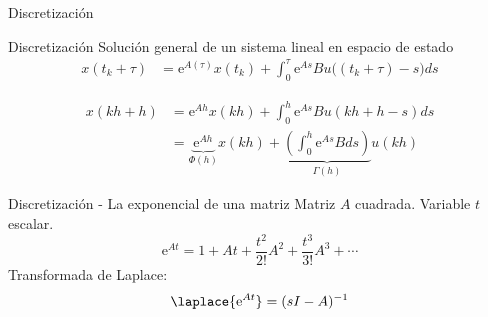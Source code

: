 \documentclass[presentation,aspectratio=1610]{beamer}
\begin{document}
\begin{frame}[label={sec:org9977e67}]{Discretización}
\end{frame}
\begin{frame}[label={sec:orgc00def8}]{Discretización}
Solución general de un sistema lineal en espacio de estado 
\begin{align*}
x(t_k+\tau)& = \mathrm{e}^{A(\tau)} x(t_k) + \int_{0}^\tau \mathrm{e}^{As} B u\big((t_k+\tau)-s) ds
\end{align*}

\begin{center}
\end{center}

 \begin{align*}
  x(kh+h) &= \mathrm{e}^{Ah} x(kh) + \int_{0}^{h} \mathrm{e}^{As} B u(kh+h-s) ds\\
   &= \underbrace{\mathrm{e}^{Ah}}_{\Phi(h)} x(kh) + \underbrace{\left(\int_{0}^h \mathrm{e}^{As} B ds \right)}_{\Gamma(h)} u(kh)
\end{align*}
\end{frame}

\begin{frame}[label={sec:orgd443f9e}]{Discretización - La exponencial de una matriz}
Matriz \(A\) cuadrada. Variable \(t\) escalar.
\[ \mathrm{e}^{At} = 1 + At + \frac{t^2}{2!}A^2 + \frac{t^3}{3!} A^3 + \cdots\]
Transformada de Laplace:
\[ \laplace{\mathrm{e}^{At}} = (sI - A)^{-1}\]
\end{frame}
\end{document}
